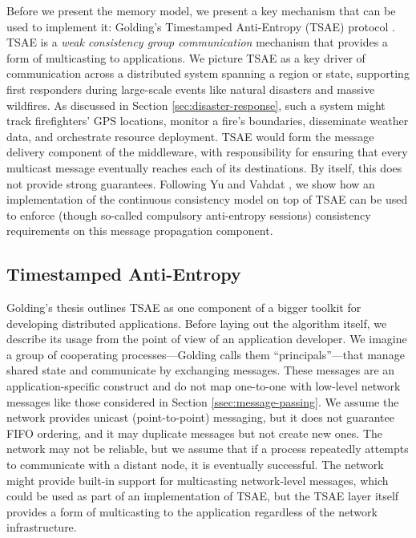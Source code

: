 \documentclass[]             %
{NASA}                       %
\theoremstyle{definition}
\begin{document}
Before we present the memory model, we present a key mechanism that
can be used to implement it: Golding's Timestamped Anti-Entropy (TSAE)
protocol \cite{1992:golding-thesis}. TSAE is a \emph{weak consistency
  group communication} mechanism that provides a form of multicasting
to applications. We picture TSAE as a key driver of communication
across a distributed system spanning a region or state, supporting
first responders during large-scale events like natural disasters and
massive wildfires. As discussed in Section
\ref{sec:disaster-response}, such a system might track firefighters'
GPS locations, monitor a fire's boundaries, disseminate weather data,
and orchestrate resource deployment. TSAE would form the message
delivery component of the middleware, with responsibility for ensuring
that every multicast message eventually reaches each of its
destinations. By itself, this does not provide strong
guarantees. Following Yu and Vahdat \cite{2002tact}, we show how an
implementation of the continuous consistency model on top of TSAE can
be used to enforce (though so-called compulsory anti-entropy sessions)
consistency requirements on this message propagation component.

\subsection{Timestamped Anti-Entropy}
\label{ssec:tsae}
Golding's thesis \cite{1992:golding-thesis} outlines TSAE as one
component of a bigger toolkit for developing distributed
applications. Before laying out the algorithm itself, we describe its
usage from the point of view of an application developer. We imagine a
group of cooperating processes---Golding calls them
``principals''---that manage shared state and communicate by
exchanging messages. These messages are an application-specific
construct and do not map one-to-one with low-level network messages
like those considered in Section \ref{ssec:message-passing}. We assume
the network provides unicast (point-to-point) messaging, but it does
not guarantee FIFO ordering, and it may duplicate messages but not
create new ones. The network may not be reliable, but we assume that
if a process repeatedly attempts to communicate with a distant node,
it is eventually successful. The network might provide built-in
support for multicasting network-level messages, which could be used
as part of an implementation of TSAE, but the TSAE layer itself
provides a form of multicasting to the application regardless of the
network infrastructure.
\end{document}

